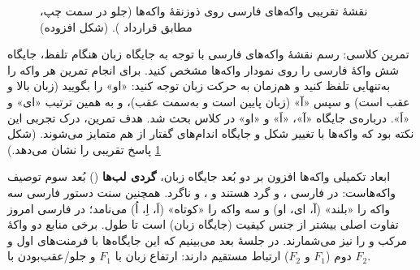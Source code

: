 \begin{figure}[htbp]
\centering
{}
\caption{نقشهٔ تقریبی واکه‌های فارسی روی ذوزنقهٔ واکه‌ها (جلو در سمت چپ، مطابق قرارداد ). (شکل افزوده)}
\label{fig:ch02-vowel-persian}
\end{figure}

\begin{assignmentbox}{تمرین کلاسی: رسم نقشهٔ واکه‌های فارسی}
با توجه به جایگاه زبان هنگام تلفظ، جایگاه شش واکهٔ فارسی را روی نمودار واکه‌ها مشخص کنید. برای انجام تمرین هر واکه را به‌تنهایی تلفظ کنید و هم‌زمان به حرکت زبان توجه کنید: «او» را بگویید (زبان بالا و عقب است) و سپس «آ» (زبان پایین است و به‌سمت عقب)، و به همین ترتیب «ای» و «اَ». درباره‌ی جایگاه «آ»، «اَ» و «او» در کلاس بحث شد. هدف تمرین، درک تجربی این نکته بود که واکه‌ها با تغییر شکل و جایگاه اندام‌های گفتار از هم متمایز می‌شوند. (شکل \ref{fig:ch02-vowel-persian} پاسخ تقریبی را نشان می‌دهد.)
\end{assignmentbox}

\begin{addedbox}{ابعاد تکمیلی واکه‌ها}
افزون بر دو بُعد جایگاه زبان، \textbf{گردی لب‌ها} () بُعد سوم توصیف واکه‌هاست: در فارسی ،  و  گرد هستند و ،  و  ناگرد. همچنین سنت دستور فارسی سه واکه را «بلند» (آ، ای، او) و سه واکه را «کوتاه» (اَ، اِ، اُ) می‌نامد؛ در فارسی امروز تفاوت اصلی بیشتر از جنس کیفیت (جایگاه زبان) است تا طول. برخی منابع دو واکهٔ مرکب  و  را نیز می‌شمارند. در جلسهٔ بعد می‌بینیم که این جایگاه‌ها با فرمنت‌های اول و دوم ($F_1$ و $F_2$) ارتباط مستقیم دارند: ارتفاع زبان با $F_1$ و جلو/عقب‌بودن با $F_2$.
\end{addedbox}

